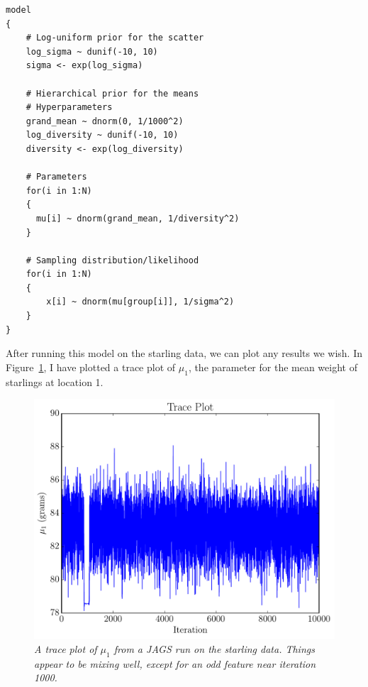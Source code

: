 \begin{verbatim}
model
{
    # Log-uniform prior for the scatter
    log_sigma ~ dunif(-10, 10)
    sigma <- exp(log_sigma)

    # Hierarchical prior for the means
    # Hyperparameters
    grand_mean ~ dnorm(0, 1/1000^2)
    log_diversity ~ dunif(-10, 10)
    diversity <- exp(log_diversity)

    # Parameters
    for(i in 1:N)
    {
      mu[i] ~ dnorm(grand_mean, 1/diversity^2)
    }

    # Sampling distribution/likelihood
    for(i in 1:N)
    {
        x[i] ~ dnorm(mu[group[i]], 1/sigma^2)
    }
}
\end{verbatim}

After running this model on the starling data, we can plot any results we
wish. In Figure~\ref{fig:trace_starlings2}, I have plotted a trace plot of
$\mu_1$, the parameter for the mean weight of starlings at location 1.

\begin{figure}[!ht]
\begin{center}
\includegraphics[scale=0.6]{Figures/trace_starlings.pdf}
\caption{\it A trace plot of $\mu_1$ from a JAGS run on the starling data. Things
appear to be mixing well, except for an odd feature near iteration 1000.
\label{fig:trace_starlings2}}
\end{center}
\end{figure}


